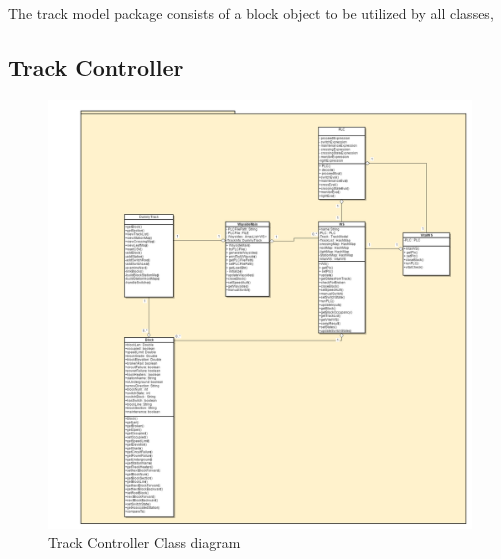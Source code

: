 \documentclass[]{article}
\begin{document}
The track model package consists of a block object to be utilized by all classes, 
\subsection{Track Controller}
	\begin{figure}[H]
		\centering
		\includegraphics[scale=.25]{trackcontroller.png}
		\caption{Track Controller Class diagram}
	\end{figure}
\end{document}
